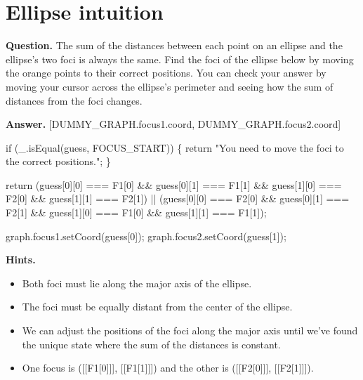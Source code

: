 \documentclass{article}
\begin{document}
\section*{Ellipse intuition}
\textbf{Question.} The sum of the distances between each point on an ellipse and the ellipse's two foci is always the same.
                    Find the foci of the ellipse below by moving the orange points to their correct positions.
                    You can check your answer by moving your cursor across the ellipse's perimeter and seeing how the sum of distances from the foci changes.

\textbf{Answer.} [DUMMY\_GRAPH.focus1.coord, DUMMY\_GRAPH.focus2.coord]
                        
                            if (\_.isEqual(guess, FOCUS\_START)) \{
                                return "You need to move the foci to the correct positions.";
                            \}

                            return (guess[0][0] === F1[0] \&\& guess[0][1] === F1[1] \&\&
                                    guess[1][0] === F2[0] \&\& guess[1][1] === F2[1]) ||
                                   (guess[0][0] === F2[0] \&\& guess[0][1] === F2[1] \&\&
                                    guess[1][0] === F1[0] \&\& guess[1][1] === F1[1]);
                        
                        
                            graph.focus1.setCoord(guess[0]);
                            graph.focus2.setCoord(guess[1]);

\textbf{Hints.}
\begin{itemize}
  \item Both foci must lie along the major axis of the ellipse.
  \item The foci must be equally distant from the center of the ellipse.
  \item We can adjust the positions of the foci along the major axis
                        until we've found the unique state where the sum of the distances is constant.
  \item One focus is ([[F1[0]]], [[F1[1]]])
                            and the other is ([[F2[0]]], [[F2[1]]]).
\end{itemize}
\end{document}
